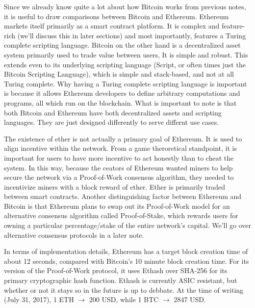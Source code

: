 \documentclass[full.tex]{subfiles}
\begin{document}
    Since we already know quite a lot about how Bitcoin works from previous notes, it is useful to draw comparisons between Bitcoin and Ethereum. Ethereum markets itself primarily as a smart contract platform. It is complex and feature-rich (we'll discuss this in later sections) and most importantly, features a Turing complete scripting language. Bitcoin on the other hand is a decentralized asset system primarily used to trade value between users, It is simple and robust. This extends even to its underlying scripting language (Script, or often times just the Bitcoin Scripting Language), which is simple and stack-based, and not at all Turing complete. Why having a Turing complete scripting language is important is because it allows Ethereum developers to define arbitrary computations and programs, all which run on the blockchain. What is important to note is that both Bitcoin and Ethereum have both decentralized assets and scripting languages. They are just designed differently to serve differnt use cases.
    
    The existence of ether is not actually a primary goal of Ethereum. It is used to align incentive within the network. From a game theroretical standpoint, it is important for users to have more incentive to act honestly than to cheat the system. In this way, because the ceators of Ethereum wanted miners to help secure the network via a Proof-of-Work consensus algorithm, they needed to incentivize miners with a block reward of ether. Ether is primarily traded between smart contracts. Another distinguishing factor between Ethereum and Bitcoin is that Ethereum plans to swap out its Proof-of-Work model for an alternative consensus algorithm called Proof-of-Stake, which rewards users for owning a particular percentage/stake of the entire network's capital. We'll go over alternative consensus protocols in a later note.
    
    In terms of implementation details, Ethereum has a target block creation time of about 12 seconds, compared with Bitcoin's 10 minute block creation time. For its version of the Proof-of-Work protocol, it uses Ethash over SHA-256 for its primary cryptographic hash function. Ethash is currently ASIC resistant, but whether or not it stays so in the future is up to debbate. At the time of writing (July 31, 2017), 1 ETH $\rightarrow$ 200 USD, while 1 BTC $\rightarrow$ 2847 USD.
    
    
    \section*{}
    
\end{document}
